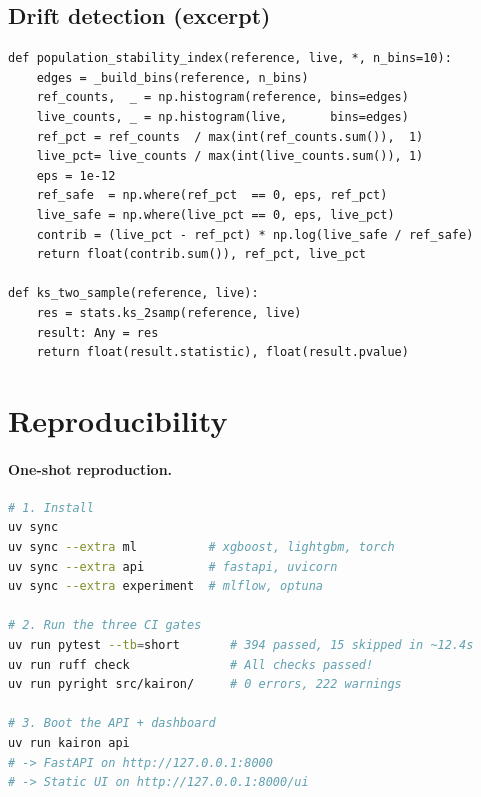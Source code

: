 \documentclass[11pt,a4paper]{article}
\let\oldsection\section
\renewcommand{\section}{\clearpage\oldsection}
\begin{document}
\subsection{Drift detection (excerpt)}
\begin{lstlisting}[caption={Excerpt of \texttt{kairon/live/drift.py}: the
Population Stability Index and the two-sample KS test.
Severity bands: PSI $<0.1$ ok, $0.1$--$0.2$ warning,
$>0.2$ critical; KS $<0.05$ ok, $0.05$--$0.10$ warning,
$>0.10$ critical.},label={lst:drift}]
def population_stability_index(reference, live, *, n_bins=10):
    edges = _build_bins(reference, n_bins)
    ref_counts,  _ = np.histogram(reference, bins=edges)
    live_counts, _ = np.histogram(live,      bins=edges)
    ref_pct = ref_counts  / max(int(ref_counts.sum()),  1)
    live_pct= live_counts / max(int(live_counts.sum()), 1)
    eps = 1e-12
    ref_safe  = np.where(ref_pct  == 0, eps, ref_pct)
    live_safe = np.where(live_pct == 0, eps, live_pct)
    contrib = (live_pct - ref_pct) * np.log(live_safe / ref_safe)
    return float(contrib.sum()), ref_pct, live_pct

def ks_two_sample(reference, live):
    res = stats.ks_2samp(reference, live)
    result: Any = res
    return float(result.statistic), float(result.pvalue)
\end{lstlisting}

\section{Reproducibility}\label{app:repro}

\paragraph{One-shot reproduction.}
\begin{lstlisting}[language=bash,basicstyle=\ttfamily\footnotesize,
                   backgroundcolor=\color{codebg},
                   frame=single,rulecolor=\color{codeframe}]
# 1. Install
uv sync
uv sync --extra ml          # xgboost, lightgbm, torch
uv sync --extra api         # fastapi, uvicorn
uv sync --extra experiment  # mlflow, optuna

# 2. Run the three CI gates
uv run pytest --tb=short       # 394 passed, 15 skipped in ~12.4s
uv run ruff check              # All checks passed!
uv run pyright src/kairon/     # 0 errors, 222 warnings

# 3. Boot the API + dashboard
uv run kairon api
# -> FastAPI on http://127.0.0.1:8000
# -> Static UI on http://127.0.0.1:8000/ui
\end{lstlisting}
\end{document}
